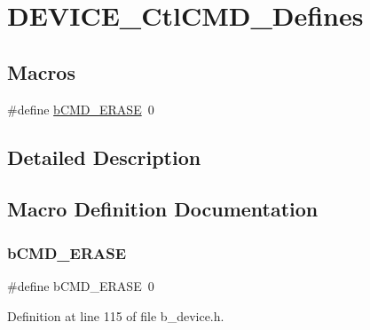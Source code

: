 \hypertarget{group___d_e_v_i_c_e___ctl_c_m_d___defines}{}\section{D\+E\+V\+I\+C\+E\+\_\+\+Ctl\+C\+M\+D\+\_\+\+Defines}
\label{group___d_e_v_i_c_e___ctl_c_m_d___defines}
\subsection*{Macros}
\begin{DoxyCompactItemize}
\item 
\#define \mbox{\hyperlink{group___d_e_v_i_c_e___ctl_c_m_d___defines_ga96464751587c9b064a2c7cee9881402a}{b\+C\+M\+D\+\_\+\+E\+R\+A\+SE}}~0
\end{DoxyCompactItemize}


\subsection{Detailed Description}


\subsection{Macro Definition Documentation}
\mbox{\label{group___d_e_v_i_c_e___ctl_c_m_d___defines_ga96464751587c9b064a2c7cee9881402a}} 
\subsubsection{\texorpdfstring{b\+C\+M\+D\+\_\+\+E\+R\+A\+SE}{bCMD\_ERASE}}
{\footnotesize\ttfamily \#define b\+C\+M\+D\+\_\+\+E\+R\+A\+SE~0}



Definition at line 115 of file b\+\_\+device.\+h.

